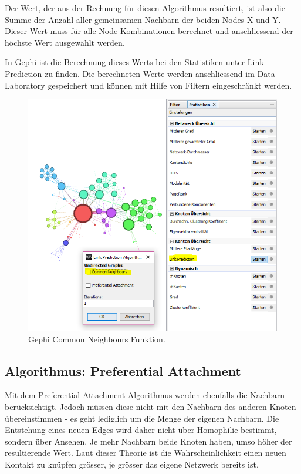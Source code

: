 Der Wert, der aus der Rechnung für diesen Algorithmus resultiert, ist also die Summe der Anzahl aller gemeinsamen
Nachbarn der beiden Nodes X und Y. Dieser Wert muss für alle Node-Kombinationen berechnet und anschliessend der höchste
Wert ausgewählt werden.

In Gephi ist die Berechnung dieses Werts bei den Statistiken unter Link Prediction zu finden. Die berechneten Werte
werden anschliessend im Data Laboratory gespeichert und können mit Hilfe von Filtern eingeschränkt werden.

\begin{figure}[htbp]
    \includegraphics[width=\linewidth]{resources/gephi-CN.png}
    \caption{Gephi Common Neighbours Funktion.}
    \label{fig:screen8}
\end{figure}

\subsection{Algorithmus: Preferential Attachment}

Mit dem Preferential Attachment Algorithmus werden ebenfalls die Nachbarn berücksichtigt. Jedoch müssen diese nicht
mit den Nachbarn des anderen Knoten übereinstimmen - es geht lediglich um die Menge der eigenen Nachbarn. Die Entstehung
eines neuen Edges wird daher nicht über Homophilie bestimmt, sondern über Ansehen. Je mehr Nachbarn beide Knoten haben,
umso höher der resultierende Wert. Laut dieser Theorie ist die Wahrscheinlichkeit einen neuen Kontakt zu knüpfen
grösser, je grösser das eigene Netzwerk bereits ist.

